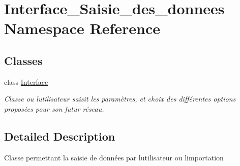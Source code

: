 \hypertarget{namespace_interface___saisie__des__donnees}{}\section{Interface\+\_\+\+Saisie\+\_\+des\+\_\+donnees Namespace Reference}
\label{namespace_interface___saisie__des__donnees}
\subsection*{Classes}
\begin{DoxyCompactItemize}
\item 
class \hyperlink{class_interface___saisie__des__donnees_1_1_interface}{Interface}
\begin{DoxyCompactList}\small\item\em Classe ou l\textquotesingle{}utilisateur saisit les paramètres, et choix des différentes options proposées pour son futur réseau. \end{DoxyCompactList}\end{DoxyCompactItemize}


\subsection{Detailed Description}
Classe permettant la saisie de données par l\textquotesingle{}utilisateur ou l\textquotesingle{}importation 
